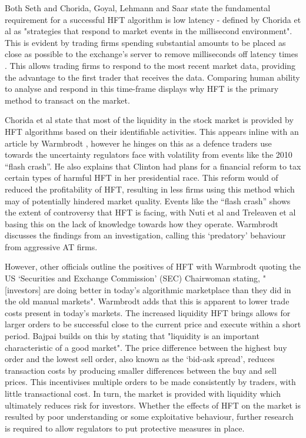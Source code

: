 Both Seth \cite{WEB:SETH:0001} and Chorida, Goyal, Lehmann and Saar \cite{REPORT:ChordiaEtAl:2013} state the fundamental requirement for a successful HFT algorithm is low latency - defined by Chorida et al as "strategies that respond to market events in the millisecond environment". This is evident by trading firms spending substantial amounts to be placed as close as possible to the exchange's server to remove milliseconds off latency times \cite{ART:Aswani:2016}. This allows trading firms to respond to the most recent market data, providing the advantage to the first trader that receives the data. Comparing human ability to analyse and respond in this time-frame displays why HFT is the primary method to transact on the market.

Chorida et al \cite{REPORT:ChordiaEtAl:2013} state that most of the liquidity in the stock market is provided by HFT algorithms based on their identifiable activities. This appears inline with an article by Warmbrodt \cite{ART:Warmbrodt:2016}, however he hinges on this as a defence traders use towards the uncertainty regulators face with volatility from events like the 2010 ``flash crash''. He also explains that Clinton had plans for a financial reform to tax certain types of harmful HFT in her presidential race. This reform would of reduced the profitability of HFT, resulting in less firms using this method which may of potentially hindered market quality. Events like the ``flash crash'' shows the extent of controversy that HFT is facing, with Nuti et al \cite{ART:Nuti:2011} and Treleaven et al \cite{ART:Treleaven:2013} basing this on the lack of knowledge towards how they operate. Warmbrodt \cite{ART:Warmbrodt:2016} discusses the findings from an investigation, calling this `predatory' behaviour from aggressive AT firms. 

However, other officials outline the positives of HFT with Warmbrodt \cite{ART:Warmbrodt:2016} quoting the US `Securities and Exchange Commission' (SEC) Chairwoman stating, "[investors] are doing better in today's algorithmic marketplace than they did in the old manual markets". Warmbrodt adds that this is apparent to lower trade costs present in today's markets. The increased liquidity HFT brings allows for larger orders to be successful close to the current price and execute within a short period.  Bajpai \cite{WEB:Bajpai:0001} builds on this by stating that "liquidity is an important characteristic of a good market". The price difference between the highest buy order and the lowest sell order, also known as the `bid-ask spread', reduces transaction costs by producing smaller differences between the buy and sell prices. This incentivises multiple orders to be made consistently by traders, with little transactional cost. In turn, the market is provided with liquidity which ultimately reduces risk for investors. Whether the effects of HFT on the market is resulted by poor understanding or some exploitative behaviour, further research is required to allow regulators to put protective measures in place. 

